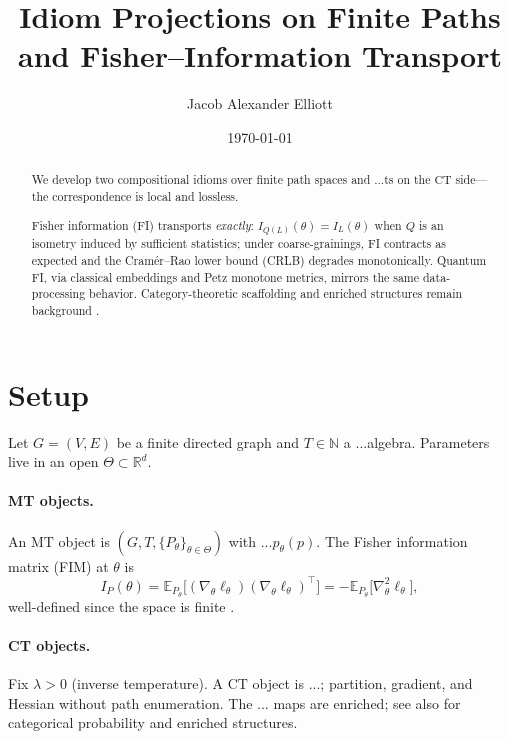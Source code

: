 \documentclass[11pt]{article}
\title{\textbf{Idiom Projections on Finite Paths and Fisher--Information Transport}}
\author{Jacob Alexander Elliott}
\date{\today}
\newcommand{\MT}{\mathrm{MT}}
\newcommand{\CT}{\mathrm{CT}}
\newcommand{\E}{\mathbb{E}}
\begin{document}
\maketitle

\begin{abstract}
We develop two compositional idioms over finite path spaces and ...ts on the $\CT$ side---the correspondence is local and lossless.

Fisher information (FI) transports \emph{exactly}: $I_{Q(L)}(\theta)\!=\!I_{L}(\theta)$ when $Q$ is an isometry induced by sufficient statistics; under coarse-grainings, FI contracts as expected and the Cram\'er--Rao lower bound (CRLB) degrades monotonically. Quantum FI, via classical embeddings and Petz monotone metrics, mirrors the same data-processing behavior. Category-theoretic scaffolding and enriched structures remain background \parencite{Kelly1982,Elliott2025ModalShell}.
\end{abstract}

\section{Setup}\label{sec:setup}
Let $G=(V,E)$ be a finite directed graph and $T\in\mathbb{N}$ a ...algebra. Parameters live in an open $\Theta\subset\mathbb{R}^d$.

\paragraph{MT objects.}
An $\MT$ object is $(G,T,\{P_\theta\}_{\theta\in\Theta})$ with $...p_\theta(p)$. The Fisher information matrix (FIM) at $\theta$ is
\begin{equation}
I_P(\theta)
=\E_{P_\theta}\!\big[(\nabla_\theta \ell_\theta)(\nabla_\theta \ell_\theta)^\top\big]
=-\E_{P_\theta}\!\big[\nabla_\theta^2 \ell_\theta\big],
\end{equation}
well-defined since the space is finite \parencite{Fisher1922}.

\paragraph{CT objects.}
Fix $\lambda>0$ (inverse temperature). A $\CT$ object is ...; partition, gradient, and Hessian without path enumeration. The ... maps are enriched; see also \parencite{Giry1982,Fritz2020,Kelly1982} for categorical probability and enriched structures.
\end{document}
